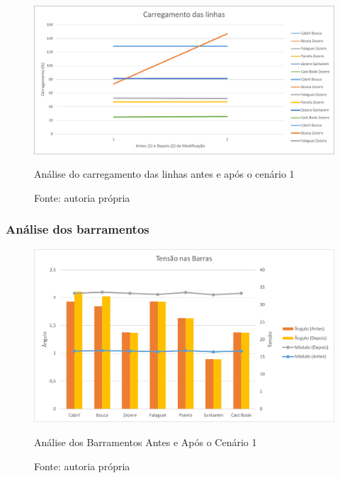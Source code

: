 \begin{figure}[H]
	\centering
	\captionsetup{width=\textwidth, font=footnotesize, textfont=bf}	
	\includegraphics[width=0.9\linewidth]{img/carregamento_linhas_caso1.pdf}
	\caption{Análise do carregamento das linhas antes e após o cenário 1}
	\vspace{-3.5mm}
	\caption*{Fonte: autoria própria}
	\label{fig:carregamento_linhas_caso1}
\end{figure}

    
\subsubsection{Análise dos barramentos}

\begin{figure}[H]
	\centering
	\captionsetup{width=\textwidth, font=footnotesize, textfont=bf}	
	\includegraphics[width=\linewidth]{img/tensoes_barras_caso1.pdf}
	\caption{Análise dos Barramentos Antes e Após o Cenário 1}
	\vspace{-3.5mm}
	\caption*{Fonte: autoria própria}
	\label{fig:tensoes_barras_caso1}
\end{figure}
